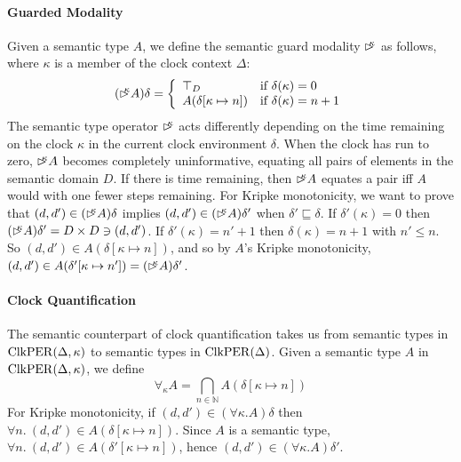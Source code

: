 \paragraph{Guarded Modality} Given a semantic type $A$, we define the
semantic guard modality $\mathord{\rhd\kern-0.4em^{\kappa}}$ as follows, where $\kappa$ is a
member of the clock context $\Delta$:
\begin{displaymath}
  (\mathord{\rhd\kern-0.4em^{\kappa}} A)\delta = \left\{
    \begin{array}{ll}
      \top_D & \textrm{if }\delta(\kappa) = 0 \\
      A(\delta[\kappa \mapsto n]) & \textrm{if }\delta(\kappa) = n + 1
    \end{array}
  \right.
\end{displaymath}
The semantic type operator $\mathord{\rhd\kern-0.4em^{\kappa}}$ acts differently
depending on the time remaining on the clock $\kappa$ in the current
clock environment $\delta$. When the clock has run to zero,
$\mathord{\rhd\kern-0.4em^{\kappa}} A$ becomes completely uninformative, equating all pairs
of elements in the semantic domain $D$. If there is time remaining,
then $\mathord{\rhd\kern-0.4em^{\kappa}} A$ equates a pair iff $A$ would with one fewer
steps remaining. For Kripke monotonicity, we want to prove that
$(d,d') \in (\mathord{\rhd\kern-0.4em^{\kappa}} A)\delta$ implies $(d,d') \in (\mathord{\rhd\kern-0.4em^{\kappa}}
A)\delta'$ when $\delta' \sqsubseteq \delta$. If $\delta'(\kappa) = 0$
then $(\mathord{\rhd\kern-0.4em^{\kappa}} A)\delta' = D \times D \ni (d,d')$. If
$\delta'(\kappa) = n' + 1$ then $\delta(\kappa) = n + 1$ with $n' \leq
n$. So $(d,d') \in A(\delta[\kappa \mapsto n])$, and so by $A$'s Kripke
monotonicity, $(d,d') \in A(\delta'[\kappa \mapsto n']) =
(\mathord{\rhd\kern-0.4em^{\kappa}} A)\delta'$.

\paragraph{Clock Quantification}
The semantic counterpart of clock quantification takes us from
semantic types in $\mathrm{ClkPER}(\Delta, \kappa)$ to semantic types in
$\mathrm{ClkPER}(\Delta)$. Given a semantic type $A$ in $\mathrm{ClkPER}(\Delta,
\kappa)$, we define
\begin{displaymath}
  \forall_\kappa A = \bigcap_{n \in \mathbb{N}} A(\delta[\kappa \mapsto n])
\end{displaymath}
For Kripke monotonicity, if $(d,d') \in (\forall\kappa. A)\delta$ then
$\forall n.\ (d,d') \in A(\delta[\kappa \mapsto n])$. Since $A$ is a
semantic type, $\forall n.\ (d,d') \in A(\delta'[\kappa \mapsto n])$,
hence $(d,d') \in (\forall\kappa. A)\delta'$.

